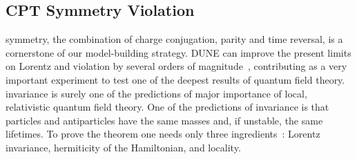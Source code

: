 \subsection{CPT Symmetry Violation}

 symmetry, the combination of charge conjugation, parity and time reversal, is a cornerstone of our model-building strategy. 
DUNE can improve the present limits on Lorentz and  violation by several orders of magnitude~\cite{Streater:1989vi,Barenboim:2002tz,Kostelecky:2003cr,Diaz:2009qk,Kostelecky:2011gq,Barenboim:2017ewj}, contributing as a very important experiment to test one of the deepest results of quantum field theory.
%
 invariance is surely one of the predictions of major importance of local, relativistic quantum field theory. One of the predictions of  invariance is that particles and antiparticles have the same masses and, if unstable, the same lifetimes. To prove the  theorem one needs only three ingredients~\cite{Streater:1989vi}: Lorentz invariance, hermiticity of the Hamiltonian, and locality.
%

